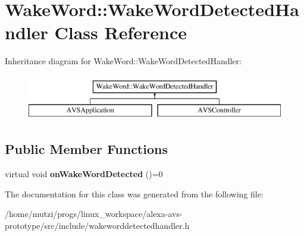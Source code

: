 \hypertarget{classWakeWord_1_1WakeWordDetectedHandler}{}\section{Wake\+Word\+:\+:Wake\+Word\+Detected\+Handler Class Reference}
\label{classWakeWord_1_1WakeWordDetectedHandler}
Inheritance diagram for Wake\+Word\+:\+:Wake\+Word\+Detected\+Handler\+:\begin{figure}[H]
\begin{center}
\leavevmode
\includegraphics[height=2.000000cm]{d2/d12/classWakeWord_1_1WakeWordDetectedHandler}
\end{center}
\end{figure}
\subsection*{Public Member Functions}
\begin{DoxyCompactItemize}
\item 
\mbox{\label{classWakeWord_1_1WakeWordDetectedHandler_a85d0040609d8e47367dd1fdac15fa462}} 
virtual void {\bfseries on\+Wake\+Word\+Detected} ()=0
\end{DoxyCompactItemize}


The documentation for this class was generated from the following file\+:\begin{DoxyCompactItemize}
\item 
/home/mutzi/progs/linux\+\_\+workspace/alexa-\/avs-\/prototype/src/include/wakeworddetectedhandler.\+h\end{DoxyCompactItemize}

